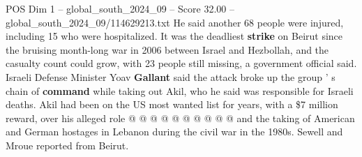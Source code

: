 \begin{textsample}{POS Dim 1 – global\_south\_2024\_09 – Score 32.00 – global\_south\_2024\_09/114629213.txt}
He said another 68 people were injured, including 15 who were hospitalized.
It was the deadliest \textbf{strike} on Beirut since the bruising month-long war in 2006 between Israel and Hezbollah, and the casualty count could grow, with 23 people still missing, a government official said.
Israeli Defense Minister Yoav \textbf{Gallant} said the attack broke up the group ' s chain of \textbf{command} while taking out Akil, who he said was responsible for Israeli deaths.
Akil had been on the US most wanted list for years, with a \$7 million reward, over his alleged role @ @ @ @ @ @ @ @ @ @ and the taking of American and German hostages in Lebanon during the civil war in the 1980s.
Sewell and Mroue reported from Beirut.

\end{textsample}
